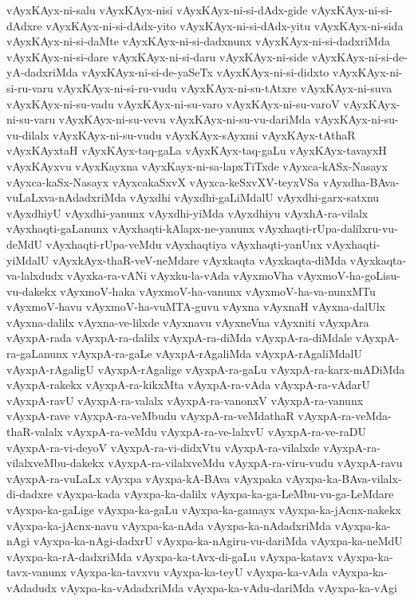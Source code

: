 {vAyxKAyx-ni-salu
vAyxKAyx-nisi
vAyxKAyx-ni-si-dAdx-gide
vAyxKAyx-ni-si-dAdxre
vAyxKAyx-ni-si-dAdx-yito
vAyxKAyx-ni-si-dAdx-yitu
vAyxKAyx-ni-sida
vAyxKAyx-ni-si-daMte
vAyxKAyx-ni-si-dadxnunx
vAyxKAyx-ni-si-dadxriMda
vAyxKAyx-ni-si-dare
vAyxKAyx-ni-si-daru
vAyxKAyx-ni-side
vAyxKAyx-ni-si-de-yA-dadxriMda
vAyxKAyx-ni-si-de-yaSeTx
vAyxKAyx-ni-si-didxto
vAyxKAyx-ni-si-ru-varu
vAyxKAyx-ni-si-ru-vudu
vAyxKAyx-ni-su-tAtxre
vAyxKAyx-ni-suva
vAyxKAyx-ni-su-vadu
vAyxKAyx-ni-su-varo
vAyxKAyx-ni-su-varoV
vAyxKAyx-ni-su-varu
vAyxKAyx-ni-su-vevu
vAyxKAyx-ni-su-vu-dariMda
vAyxKAyx-ni-su-vu-dilalx
vAyxKAyx-ni-su-vudu
vAyxKAyx-sAyxmi
vAyxKAyx-tAthaR
vAyxKAyxtaH
vAyxKAyx-taq-gaLa
vAyxKAyx-taq-gaLu
vAyxKAyx-tavayxH
vAyxKAyxvu
vAyxKayxna
vAyxKayx-ni-sa-lapxTiTxde
vAyxca-kASx-Nasayx
vAyxca-kaSx-Nasayx
vAyxcakaSxvX
vAyxca-keSxvXV-teyxVSa
vAyxdha-BAva-vuLaLxva-nAdadxriMda
vAyxdhi
vAyxdhi-gaLiMdalU
vAyxdhi-garx-satxnu
vAyxdhiyU
vAyxdhi-yanunx
vAyxdhi-yiMda
vAyxdhiyu
vAyxhA-ra-vilalx
vAyxhaqti-gaLanunx
vAyxhaqti-kAlapx-ne-yanunx
vAyxhaqti-rUpa-dalilxru-vu-deMdU
vAyxhaqti-rUpa-veMdu
vAyxhaqtiya
vAyxhaqti-yanUnx
vAyxhaqti-yiMdalU
vAyxkAyx-thaR-veV-neMdare
vAyxkaqta
vAyxkaqta-diMda
vAyxkaqta-va-lalxdudx
vAyxka-ra-vANi
vAyxku-la-vAda
vAyxmoVha
vAyxmoV-ha-goLisu-vu-dakekx
vAyxmoV-haka
vAyxmoV-ha-vanunx
vAyxmoV-ha-va-nunxMTu
vAyxmoV-havu
vAyxmoV-ha-vuMTA-guvu
vAyxna
vAyxnaH
vAyxna-dalUlx
vAyxna-dalilx
vAyxna-ve-lilxde
vAyxnavu
vAyxneVna
vAyxniti
vAyxpAra
vAyxpA-rada
vAyxpA-ra-dalilx
vAyxpA-ra-diMda
vAyxpA-ra-diMdale
vAyxpA-ra-gaLanunx
vAyxpA-ra-gaLe
vAyxpA-rAgaliMda
vAyxpA-rAgaliMdalU
vAyxpA-rAgaligU
vAyxpA-rAgalige
vAyxpA-ra-gaLu
vAyxpA-ra-karx-mADiMda
vAyxpA-rakekx
vAyxpA-ra-kikxMta
vAyxpA-ra-vAda
vAyxpA-ra-vAdarU
vAyxpA-ravU
vAyxpA-ra-valalx
vAyxpA-ra-vanonxV
vAyxpA-ra-vanunx
vAyxpA-rave
vAyxpA-ra-veMbudu
vAyxpA-ra-veMdathaR
vAyxpA-ra-veMda-thaR-valalx
vAyxpA-ra-veMdu
vAyxpA-ra-ve-lalxvU
vAyxpA-ra-ve-raDU
vAyxpA-ra-vi-deyoV
vAyxpA-ra-vi-didxVtu
vAyxpA-ra-vilalxde
vAyxpA-ra-vilalxveMbu-dakekx
vAyxpA-ra-vilalxveMdu
vAyxpA-ra-viru-vudu
vAyxpA-ravu
vAyxpA-ra-vuLaLx
vAyxpa
vAyxpa-kA-BAva
vAyxpaka
vAyxpa-ka-BAva-vilalx-di-dadxre
vAyxpa-kada
vAyxpa-ka-dalilx
vAyxpa-ka-ga-LeMbu-vu-ga-LeMdare
vAyxpa-ka-gaLige
vAyxpa-ka-gaLu
vAyxpa-ka-gamayx
vAyxpa-ka-jAcnx-nakekx
vAyxpa-ka-jAcnx-navu
vAyxpa-ka-nAda
vAyxpa-ka-nAdadxriMda
vAyxpa-ka-nAgi
vAyxpa-ka-nAgi-dadxrU
vAyxpa-ka-nAgiru-vu-dariMda
vAyxpa-ka-neMdU
vAyxpa-ka-rA-dadxriMda
vAyxpa-ka-tAvx-di-gaLu
vAyxpa-katavx
vAyxpa-ka-tavx-vanunx
vAyxpa-ka-tavxvu
vAyxpa-ka-teyU
vAyxpa-ka-vAda
vAyxpa-ka-vAdadudx
vAyxpa-ka-vAdadxriMda
vAyxpa-ka-vAdu-dariMda
vAyxpa-ka-vAgi
}
